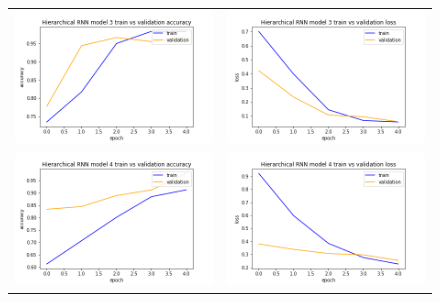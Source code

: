 \begin{figure}
\begin{tabular}{cc}
\includegraphics[width=6.5cm]{images/classifier/model-output-hier-rnn-339/model-3-train-vs-validation-accuracy}&
\includegraphics[width=6.5cm]{images/classifier/model-output-hier-rnn-339/model-3-train-vs-validation-loss}\\

\includegraphics[width=6.5cm]{images/classifier/model-output-hier-rnn-339/model-4-train-vs-validation-accuracy}&
\includegraphics[width=6.5cm]{images/classifier/model-output-hier-rnn-339/model-4-train-vs-validation-loss}\\


\end{tabular}
\end{figure}
